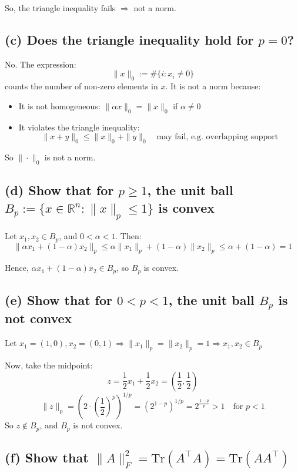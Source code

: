 \documentclass{article}
\begin{document}
So, the triangle inequality fails \(\Rightarrow\) not a norm.

\subsection*{(c) Does the triangle inequality hold for \( p = 0 \)?}

No. The expression:
\[
\|x\|_0 := \#\{i : x_i \neq 0\}
\]
counts the number of non-zero elements in \( x \). It is not a norm because:
\begin{itemize}
    \item It is not homogeneous: \( \|\alpha x\|_0 = \|x\|_0 \) if \( \alpha \neq 0 \)
    \item It violates the triangle inequality:
    \[
    \|x + y\|_0 \leq \|x\|_0 + \|y\|_0 \quad \text{may fail, e.g. overlapping support}
    \]
\end{itemize}
So \( \|\cdot\|_0 \) is not a norm.

\subsection*{(d) Show that for \( p \geq 1 \), the unit ball \( B_p := \{x \in \mathbb{R}^n : \|x\|_p \leq 1\} \) is convex}

Let \( x_1, x_2 \in B_p \), and \( 0 < \alpha < 1 \). Then:
\[
\|\alpha x_1 + (1 - \alpha)x_2\|_p \leq \alpha\|x_1\|_p + (1 - \alpha)\|x_2\|_p \leq \alpha + (1 - \alpha) = 1
\]

Hence, \( \alpha x_1 + (1 - \alpha)x_2 \in B_p \), so \( B_p \) is convex.

\subsection*{(e) Show that for \( 0 < p < 1 \), the unit ball \( B_p \) is not convex}

Let \( x_1 = (1, 0), x_2 = (0, 1) \Rightarrow \|x_1\|_p = \|x_2\|_p = 1 \Rightarrow x_1, x_2 \in B_p \)

Now, take the midpoint:
\[
z = \frac{1}{2}x_1 + \frac{1}{2}x_2 = \left(\frac{1}{2}, \frac{1}{2}\right)
\]
\[
\|z\|_p = \left(2 \cdot \left(\frac{1}{2}\right)^p\right)^{1/p} = (2^{1 - p})^{1/p} = 2^{\frac{1 - p}{p}} > 1 \quad \text{for } p < 1
\]
So \( z \notin B_p \), and \( B_p \) is not convex.

\subsection*{(f) Show that \( \|A\|_F^2 = \text{Tr}(A^\top A) = \text{Tr}(AA^\top) \)}
\end{document}
